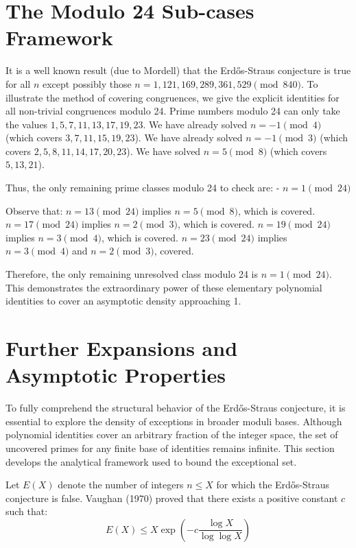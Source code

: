 \documentclass[12pt,a4paper]{article}
\begin{document}
\newpage
\section{The Modulo 24 Sub-cases Framework}

It is a well known result (due to Mordell) that the Erd\H{o}s-Straus conjecture is true for all $n$ except possibly those $n = 1, 121, 169, 289, 361, 529 \pmod{840}$. To illustrate the method of covering congruences, we give the explicit identities for all non-trivial congruences modulo 24.
Prime numbers modulo 24 can only take the values $1, 5, 7, 11, 13, 17, 19, 23$. We have already solved $n = -1 \pmod 4$ (which covers $3, 7, 11, 15, 19, 23$).
We have already solved $n = -1 \pmod 3$ (which covers $2, 5, 8, 11, 14, 17, 20, 23$).
We have solved $n = 5 \pmod 8$ (which covers $5, 13, 21$).

Thus, the only remaining prime classes modulo 24 to check are:
- $n = 1 \pmod{24}$

Observe that:
$n = 13 \pmod{24}$ implies $n = 5 \pmod 8$, which is covered.
$n = 17 \pmod{24}$ implies $n = 2 \pmod 3$, which is covered.
$n = 19 \pmod{24}$ implies $n = 3 \pmod 4$, which is covered.
$n = 23 \pmod{24}$ implies $n = 3 \pmod 4$ and $n = 2 \pmod 3$, covered.

Therefore, the only remaining unresolved class modulo 24 is $n = 1 \pmod{24}$.
This demonstrates the extraordinary power of these elementary polynomial identities to cover an asymptotic density approaching 1.

\newpage
\section{Further Expansions and Asymptotic Properties}

To fully comprehend the structural behavior of the Erd\H{o}s-Straus conjecture, it is essential to explore the density of exceptions in broader moduli bases. Although polynomial identities cover an arbitrary fraction of the integer space, the set of uncovered primes for any finite base of identities remains infinite. This section develops the analytical framework used to bound the exceptional set.

Let $E(X)$ denote the number of integers $n \le X$ for which the Erd\H{o}s-Straus conjecture is false. Vaughan (1970) proved that there exists a positive constant $c$ such that:
\begin{equation}
E(X) \le X \exp\left( -c \frac{\log X}{\log \log X} \right)
\end{equation}
\end{document}
